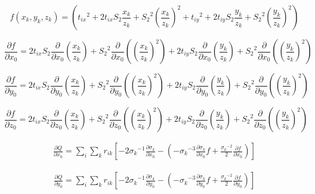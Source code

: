 \begin{equation}
f(x_k,y_k,z_k) = \left({t_{ix}}^2 + 2t_{ix}S_2\frac{x_k}{z_k} + {S_2}^2\left(\frac{x_k}{z_k}\right)^2 + {t_{iy}}^2 + 2t_{iy}S_2\frac{y_k}{z_k} + {S_2}^2\left(\frac{y_k}{z_k}\right)^2 \right)
\end{equation}

\begin{equation}
\frac{\partial f}{\partial x_0} = 2t_{ix}S_2 \frac{\partial}{\partial x_0} \left(\frac{x_k}{z_k}\right) + {S_2}^2 \frac{\partial}{\partial x_0}\left(\left(\frac{x_k}{z_k}\right)^2\right) + 2t_{iy}S_2 \frac{\partial}{\partial x_0} \left(\frac{y_k}{z_k}\right) + {S_2}^2 \frac{\partial}{\partial x_0}\left(\left(\frac{y_k}{z_k}\right)^2\right)
\end{equation}

\begin{equation}
\frac{\partial f}{\partial y_0} = 2t_{ix}S_2 \frac{\partial}{\partial y_0} \left(\frac{x_k}{z_k}\right) + {S_2}^2 \frac{\partial}{\partial y_0}\left(\left(\frac{x_k}{z_k}\right)^2\right) + 2t_{iy}S_2 \frac{\partial}{\partial y_0} \left(\frac{y_k}{z_k}\right) + {S_2}^2 \frac{\partial}{\partial y_0}\left(\left(\frac{y_k}{z_k}\right)^2\right)
\end{equation}

\begin{equation}
\frac{\partial f}{\partial z_0} = 2t_{ix}S_2 \frac{\partial}{\partial z_0} \left(\frac{x_k}{z_k}\right) + {S_2}^2 \frac{\partial}{\partial z_0}\left(\left(\frac{x_k}{z_k}\right)^2\right) + 2t_{iy}S_2 \frac{\partial}{\partial z_0} \left(\frac{y_k}{z_k}\right) + {S_2}^2 \frac{\partial}{\partial z_0}\left(\left(\frac{y_k}{z_k}\right)^2\right)
\end{equation}

\begin{align} \label{eqn:dx_no_weight}
\frac{\partial Q}{\partial x_0} = \sum_i \sum_k r_{ik} \left[ -2{\sigma_k}^{-1}\frac{\partial \sigma_k}{\partial x_0} - \left( -{\sigma_k}^{-3} \frac{\partial \sigma_k}{\partial x_0}f + \frac{{\sigma_k}^{-2}}{2} \frac{\partial f}{\partial x_0}  \right) \right] 
\end{align}

\begin{align} \label{eqn:dy_no_weight}
\frac{\partial Q}{\partial y_0} = \sum_i \sum_k r_{ik} \left[ -2{\sigma_k}^{-1}\frac{\partial \sigma_k}{\partial y_0} - \left( -{\sigma_k}^{-3} \frac{\partial \sigma_k}{\partial y_0}f + \frac{{\sigma_k}^{-2}}{2} \frac{\partial f}{\partial y_0}  \right) \right] 
\end{align}

